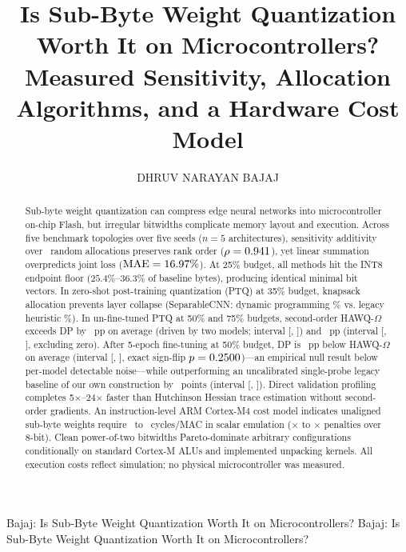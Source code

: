 \documentclass{ieeeaccess}
\begin{document}
\history{}
\doi{}

\title{Is Sub-Byte Weight Quantization Worth It on Microcontrollers? Measured Sensitivity, Allocation Algorithms, and a Hardware Cost Model}
\author{\uppercase{Dhruv Narayan Bajaj}}

\markboth
{Bajaj: Is Sub-Byte Weight Quantization Worth It on Microcontrollers?}
{Bajaj: Is Sub-Byte Weight Quantization Worth It on Microcontrollers?}


\begin{abstract}
Sub-byte weight quantization can compress edge neural networks into microcontroller on-chip Flash, but irregular bitwidths complicate memory layout and execution. Across five benchmark topologies over five seeds ($n = 5$ architectures), sensitivity additivity over \MacroRandomAllocCount\ random allocations preserves rank order ($\rho = 0.941$), yet linear summation overpredicts joint loss ($\text{MAE} = 16.97\%$). At 25\% budget, all methods hit the INT8 endpoint floor ($25.4\%$--$36.3\%$ of baseline bytes), producing identical minimal bit vectors. In zero-shot post-training quantization (PTQ) at 35\% budget, knapsack allocation prevents layer collapse (SeparableCNN: dynamic programming \MacroSepCNNDPThirtyFivePTQ\% vs. legacy heuristic \MacroSepCNNHAWQThirtyFivePTQ\%). In un-fine-tuned PTQ at 50\% and 75\% budgets, second-order HAWQ-$\Omega$ exceeds DP by \MacroPTQDPOmegaAbsMeanFifty\ pp on average (driven by two models; interval [\MacroPTQDPOmegaCILowFifty, \MacroPTQDPOmegaCIHighFifty]) and \MacroPTQDPOmegaAbsMeanSeventyFive\ pp (interval [\MacroPTQDPOmegaCILowSeventyFive, \MacroPTQDPOmegaCIHighSeventyFive], excluding zero). After 5-epoch fine-tuning at 50\% budget, DP is \MacroOmegaAbsMeanDelta\ pp below HAWQ-$\Omega$ on average (interval [\MacroOmegaCILow, \MacroOmegaCIHigh], exact sign-flip $p = 0.2500$)---an empirical null result below per-model detectable noise---while outperforming an uncalibrated single-probe legacy baseline of our own construction by \MacroLegacyMeanDelta\ points (interval [\MacroLegacyCILow, \MacroLegacyCIHigh]). Direct validation profiling completes 5$\times$--24$\times$ faster than Hutchinson Hessian trace estimation without second-order gradients. An instruction-level ARM Cortex-M4 cost model indicates unaligned sub-byte weights require \MacroCyclesScalarUnpackLow\ to \MacroCyclesScalarUnpackHigh\ cycles/MAC in scalar emulation (\MacroPenaltyScalarUnpackLow$\times$ to \MacroPenaltyScalarUnpackHigh$\times$ penalties over 8-bit). Clean power-of-two bitwidths Pareto-dominate arbitrary configurations conditionally on standard Cortex-M ALUs and implemented unpacking kernels. All execution costs reflect simulation; no physical microcontroller was measured.
\end{abstract}
\end{document}
